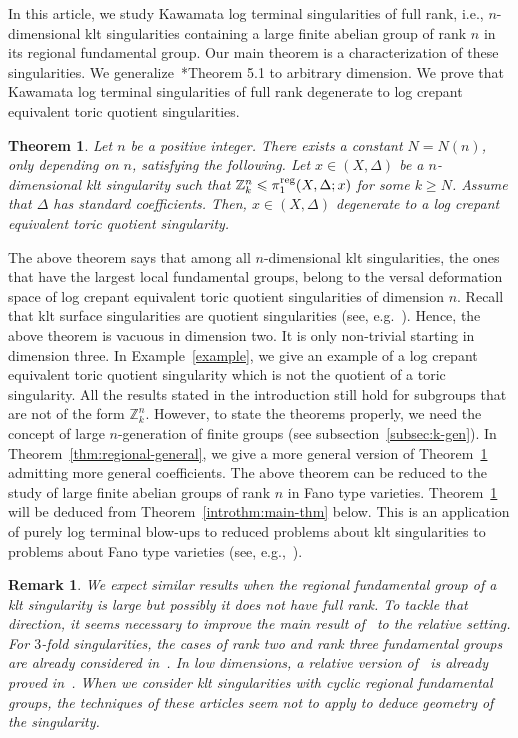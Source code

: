 \documentclass{amsart}
\newcommand{\zz}{\mathbb{Z}}
\newtheorem{introthm}{Theorem}
\newtheorem{introrem}{Remark}
\theoremstyle{remark}
\numberwithin{equation}{section}
\begin{document}
In this article, we study Kawamata log terminal singularities of full rank, i.e., $n$-dimensional klt singularities containing a large finite abelian group of rank $n$ in its regional fundamental group.
Our main theorem is  a characterization of these singularities.
We generalize~\cite{Mor20}*{Theorem 5.1} to arbitrary dimension.
We prove that Kawamata log terminal singularities of full rank
degenerate to log crepant equivalent  toric quotient singularities.

\begin{introthm}\label{introthm:degeneration}
Let $n$ be a positive integer.
There exists a constant $N=N(n)$, only depending on $n$, satisfying the following.
Let $x\in (X,\Delta)$ be a $n$-dimensional klt singularity such that
$\zz^n_k \leqslant \pi_1^{\rm reg}(X,\Delta;x)$ for some $k\geq N$.
Assume that $\Delta$ has standard coefficients.
Then, $x\in (X,\Delta)$ degenerate to a log crepant equivalent  toric quotient singularity.
\end{introthm}

The above theorem says that among all $n$-dimensional klt singularities, 
the ones that have the largest local fundamental groups, 
belong to the versal deformation space of log crepant equivalent  toric quotient singularities of dimension $n$.
Recall that klt surface singularities are quotient singularities (see, e.g.~\cite{Tsu83}). Hence, the above theorem is vacuous in dimension two.
It is only non-trivial starting in dimension three.
In Example~\ref{example}, we give an example of a log crepant equivalent  toric quotient singularity which is not the quotient of a toric singularity.
All the results stated in the introduction still hold for subgroups that are not of the form $\zz^n_k$.
However, to state the theorems properly, we need the concept of large $n$-generation of finite groups (see subsection~\ref{subsec:k-gen}).
In Theorem~\ref{thm:regional-general}, 
we give a more general version of Theorem~\ref{introthm:degeneration} admitting more general coefficients. The above theorem can be reduced to the study of large finite abelian groups of rank $n$ in Fano type varieties.
Theorem~\ref{introthm:degeneration} will be deduced from Theorem~\ref{introthm:main-thm} below.
This is an application of purely log terminal blow-ups to reduced problems about klt singularities to problems about Fano type varieties (see, e.g.,~\cites{Pro00,Xu14}).

\begin{introrem}{\em 
We expect similar results when the regional fundamental group of a klt singularity
is large but possibly it does not have full rank.
To tackle that direction, it seems necessary to improve the main result of~\cite{BMSZ18} to the relative setting.
For $3$-fold singularities, the cases of rank two and rank three fundamental groups are already considered in~\cite{Mor20}.
In low dimensions, a relative version of~\cite{BMSZ18} is already proved in~\cite{Sho00}. 
When we consider klt singularities with cyclic regional fundamental groups,
the techniques of these articles seem not to apply to deduce geometry of the singularity.
}
\end{introrem}
\end{document}
